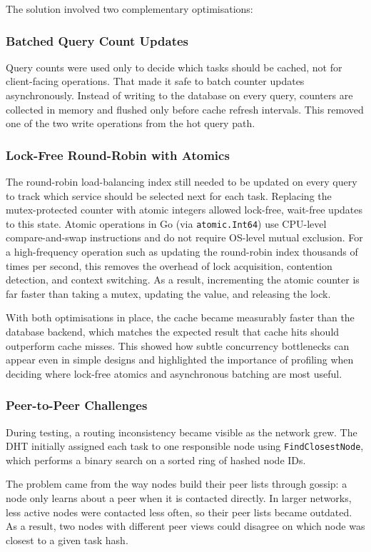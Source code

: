 \documentclass[10pt,a4paper]{article}
\begin{document}
The solution involved two complementary optimisations:

\subsubsection{Batched Query Count Updates}
Query counts were used only to decide which tasks should be cached, not for client-facing operations. That made it safe to batch counter updates asynchronously. Instead of writing to the database on every query, counters are collected in memory and flushed only before cache refresh intervals. This removed one of the two write operations from the hot query path.

\subsubsection{Lock-Free Round-Robin with Atomics}
The round-robin load-balancing index still needed to be updated on every query to track which service should be selected next for each task. Replacing the mutex-protected counter with atomic integers allowed lock-free, wait-free updates to this state. Atomic operations in Go (via \texttt{atomic.Int64}) use CPU-level compare-and-swap instructions and do not require OS-level mutual exclusion. For a high-frequency operation such as updating the round-robin index thousands of times per second, this removes the overhead of lock acquisition, contention detection, and context switching. As a result, incrementing the atomic counter is far faster than taking a mutex, updating the value, and releasing the lock.

With both optimisations in place, the cache became measurably faster than the database backend, which matches the expected result that cache hits should outperform cache misses. This showed how subtle concurrency bottlenecks can appear even in simple designs and highlighted the importance of profiling when deciding where lock-free atomics and asynchronous batching are most useful.

\subsubsection{Peer-to-Peer Challenges}
During testing, a routing inconsistency became visible as the network grew.
The DHT initially assigned each task to one responsible node using \texttt{FindClosestNode}, which performs a binary search on a sorted ring of hashed node IDs.

The problem came from the way nodes build their peer lists through gossip: a node only learns about a peer when it is contacted directly.
In larger networks, less active nodes were contacted less often, so their peer lists became outdated.
As a result, two nodes with different peer views could disagree on which node was closest to a given task hash.
\end{document}
